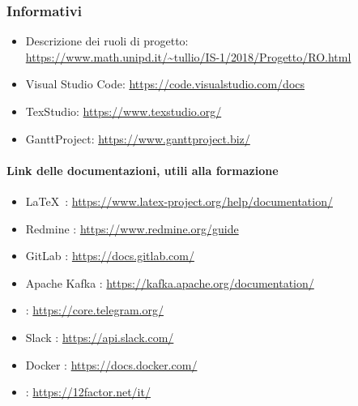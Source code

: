     \subsubsection{Informativi}	\label{rifinfo}
    \begin{itemize}
        \item Descrizione dei ruoli di progetto: \\\url{https://www.math.unipd.it/~tullio/IS-1/2018/Progetto/RO.html}
        \item Visual Studio Code: \url{https://code.visualstudio.com/docs}
        \item TexStudio: \url{https://www.texstudio.org/}
        \item GanttProject: \url{https://www.ganttproject.biz/}
	\end{itemize}

	\paragraph*{Link delle documentazioni, utili alla formazione}
	\begin{itemize}
		\item \LaTeX\ : \url{https://www.latex-project.org/help/documentation/}
		\item Redmine : \url{https://www.redmine.org/guide}
		\item GitLab : \url{https://docs.gitlab.com/}
		\item Apache Kafka : \url{https://kafka.apache.org/documentation/}
		\item {} : \url{https://core.telegram.org/}
		\item Slack : \url{https://api.slack.com/}
		\item Docker : \url{https://docs.docker.com/}
		\item {} : \url{https://12factor.net/it/}
	\end{itemize}
